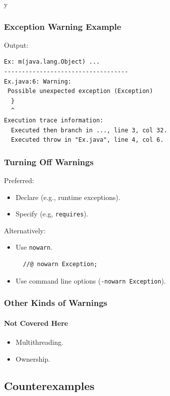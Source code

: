 \if y\MAKEHANDOUTS \documentclass[t,compress,landscape,handout]{beamer}
\begin{document}
\begin{frame}[fragile]
\frametitle{Exception Warning Example}

Output:
\begin{verbatim}
Ex: m(java.lang.Object) ...
-----------------------------------
Ex.java:6: Warning:
 Possible unexpected exception (Exception)
  }
  ^
Execution trace information:
  Executed then branch in ..., line 3, col 32.
  Executed throw in "Ex.java", line 4, col 6.
\end{verbatim}
\end{frame}

\begin{frame}[fragile]
\frametitle{Turning Off Warnings}

Preferred:
\begin{itemize}
\item
Declare (e.g., runtime exceptions).

\item
Specify (e.g, \lstinline!requires!).
\end{itemize}

Alternatively:
\begin{itemize}
\item
Use \lstinline!nowarn!.

\begin{lstlisting}
  //@ nowarn Exception;
\end{lstlisting}

\item
Use command line options
(\texttt{-nowarn Exception}).
\end{itemize}
\end{frame}

\begin{frame}
\frametitle{Other Kinds of Warnings}
\framesubtitle{Not Covered Here}

\begin{itemize}
\item
Multithreading.

\item
Ownership.
\end{itemize}
\end{frame}

\subsection[Info.]{Counterexamples}

\end{document}
